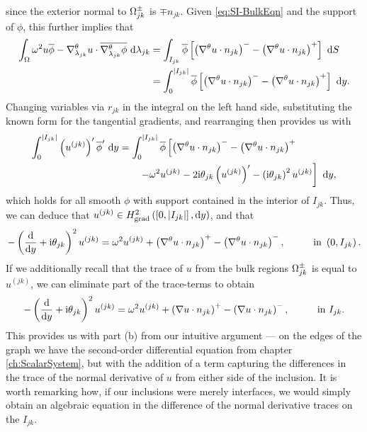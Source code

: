 since the exterior normal to $\Omega_{jk}^{\pm}$ is $\mp n_{jk}$.
Given \eqref{eq:SI-BulkEqn} and the support of $\phi$, this further implies that
\begin{align*}
	\int_{\Omega} \omega^2 u\overline{\phi} - \nabla^{\theta}_{\lambda_{jk}}u\cdot\overline{\nabla^{\theta}_{\lambda_{jk}}\phi}  \ \mathrm{d}\lambda_{jk}
	&= \int_{I_{jk}} \overline{\phi}\left[ \left( \nabla^{\theta} u\cdot n_{jk} \right)^- - \left( \nabla^{\theta} u\cdot n_{jk} \right)^+ \right]  \ \mathrm{d}S \\
	&= \int_0^{\left\lvert I_{jk} \right\rvert} \overline{\phi}\left[ \left( \nabla^{\theta} u\cdot n_{jk} \right)^- - \left( \nabla^{\theta} u\cdot n_{jk} \right)^+ \right] \ \mathrm{d} y.
\end{align*}
Changing variables via $r_{jk}$ in the integral on the left hand side, substituting the known form for the tangential gradients, and rearranging then provides us with
\begin{align*}
	\int_0^{\left\lvert I_{jk} \right\rvert} \left( u^{(jk)} \right)'\overline{\phi}' \ \mathrm{d} y
	&= \int_0^{\left\lvert I_{jk} \right\rvert} \overline{\phi}\left[  \left( \nabla^{\theta} u\cdot n_{jk} \right)^- - \left( \nabla^{\theta} u\cdot n_{jk} \right)^+ \right. \\
	&\qquad \left. - \omega^2 u^{(jk)} - 2\mathrm{i}\theta_{jk}\left( u^{(jk)} \right)' - \left( \mathrm{i}\theta_{jk} \right)^2 u^{(jk)}  \right] \ \mathrm{d} y,
\end{align*}
which holds for all smooth $\phi$ with support contained in the interior of $I_{jk}$.
Thus, we can deduce that $u^{(jk)}\in H^2_\mathrm{grad}\left( \left[ 0,\left\lvert I_{jk} \right\rvert \right], \mathrm{d}y \right)$, and that
\begin{align*}
	- \left( \dfrac{\mathrm{d}}{\mathrm{d}y} + \mathrm{i}\theta_{jk} \right)^2u^{(jk)} 
	&= \omega^2 u^{(jk)} + \left( \nabla^{\theta} u\cdot n_{jk} \right)^+ - \left( \nabla^{\theta} u\cdot n_{jk} \right)^-,
	&\qquad\text{in } \left( 0,I_{jk} \right).
\end{align*}
If we additionally recall that the trace of $u$ from the bulk regions $\Omega_{jk}^{\pm}$ is equal to $u^{(jk)}$, we can eliminate part of the trace-terms to obtain
\begin{align} \label{eq:SI-InclusionEqn}
	- \left( \dfrac{\mathrm{d}}{\mathrm{d}y} + \mathrm{i}\theta_{jk} \right)^2u^{(jk)} 
	&= \omega^2 u^{(jk)} + \left( \nabla u\cdot n_{jk} \right)^+ - \left( \nabla u\cdot n_{jk} \right)^-,
	&\qquad\text{in } I_{jk}.
\end{align}
This provides us with part (b) from our intuitive argument --- on the edges of the graph we have the second-order differential equation from chapter \ref{ch:ScalarSystem}, but with the addition of a term capturing the differences in the trace of the normal derivative of $u$ from either side of the inclusion.
It is worth remarking how, if our inclusions were merely interfaces, we would simply obtain an algebraic equation in the difference of the normal derivative traces on the $I_{jk}$.
